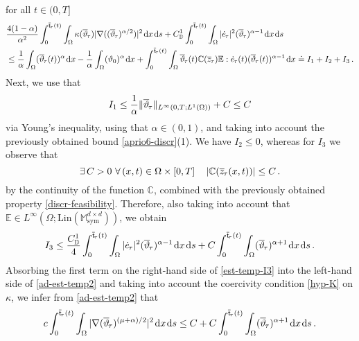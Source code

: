 \documentclass[a4paper,10pt,reqno]{amsart}
\numberwithin{equation}{section}
\newcommand{\bbM}{\mathbb{M}}
\numberwithin{equation}{section}
\def\dd{\;\!\mathrm{d}} %
\newcommand{\teta}{\vartheta}
\newcommand{\piecewiseConstant}[2]{\overline{#1}_{\kern-1pt#2}}
\newcommand{\pwc}{\piecewiseConstant}
\newcommand{\piecewiseLinear}[2]{{#1}_{\kern-1pt#2}}
\newcommand{\pwl}{\piecewiseLinear}
\newcommand{\bbC}{\mathbb{C}}
\newcommand{\bbD}{\mathbb{D}}
\newcommand{\bbE}{\mathbb{E}}
\newcommand{\mt}{\bbM}
\newcommand{\sym}{\mathrm{sym}}
\newcommand{\condu}{\kappa}
\begin{document}
 for all $t \in (0,T]$
 \begin{equation} 
 \label{ad-est-temp2}
 \begin{aligned}
 &
 \frac{4(1-\alpha)}{\alpha^2} \int_0^{\pwc{\mathsf{t}}{\tau}(t)} \int_\Omega \condu(\pwc \teta{\tau}) |\nabla ((\pwc \teta{\tau})^{\alpha/2}) |^2 \dd x \dd s  +   C_\bbD^1  \int_0^{\pwc{\mathsf{t}}{\tau}(t)}  \int_\Omega   %
 | \pwl {\dot e}\tau|^2 (\pwc \teta \tau)^{\alpha-1}  
 \dd x \dd s
\\
&
\leq
 \frac1\alpha\int_\Omega  (\pwc \teta\tau(t) )^{\alpha} \dd x -    \frac1\alpha\int_\Omega  (\teta_0)^{\alpha} \dd x +\int_0^{\pwc{\mathsf{t}}{\tau}(t)}  \int_\Omega   \pwc \teta\tau(t) \bbC(\pwc z\tau) \bbE : \pwl{\dot e}\tau(t)  ( \pwc \teta\tau(t) )^{\alpha-1}  \dd  x 
 \doteq
 I_1+I_2+I_3\,.
 \end{aligned}
 \end{equation}
 Next, we use that  
 \[
  I_1  \leq \frac1\alpha \| \pwc \teta\tau\|_{L^\infty (0,T; L^1(\Omega))} + C \leq C
 \]
 via Young's inequality, using that  $\alpha \in (0,1)$, and taking into account the previously obtained bound  \eqref{aprio6-discr}(1). 
 We have $I_2 \leq 0$, whereas for $I_3$ we observe  that 
 \begin{equation}
 \label{bound-bbC}
 \exists\, C>0 \ \forall\, (x,t) \in \Omega \times [0,T] \, \quad
 |\bbC(\pwc z\tau(x,t))| \leq C\,.
 \end{equation}
  by the continuity of the function $\bbC$, combined with the previously obtained
 property \eqref{discr-feasibility}. Therefore, also taking into account that $\bbE \in L^\infty (\Omega;\mathrm{Lin}(\mt_\sym^{d\times d}))$, we obtain 
   \begin{equation}
 \label{est-temp-I3}
 I_3 \leq 
\frac{ C_\bbD^1 }4   \int_0^{\pwc{\mathsf{t}}{\tau}(t)}  \int_\Omega  | \pwl {\dot e}\tau|^2 (\pwc \teta \tau)^{\alpha-1}   \dd x \dd s + C  \int_0^{\pwc{\mathsf{t}}{\tau}(t)}  \int_\Omega
(\pwc \teta \tau)^{\alpha+1}   \dd x \dd s\,.
 \end{equation}
 Absorbing the first term on the right-hand side of \eqref{est-temp-I3} into  the left-hand side of \eqref{ad-est-temp2} and taking into account the coercivity condition \eqref{hyp-K} on $\condu$,  
we infer from  \eqref{ad-est-temp2} that 
 \begin{equation}
  \label{ad-est-temp3}
 c   \int_0^{\pwc{\mathsf{t}}{\tau}(t)} \int_\Omega  | \nabla  (\pwc \teta \tau)^{(\mu+\alpha)/2} |^2 \dd x \dd s \leq C +  C  \int_0^{\pwc{\mathsf{t}}{\tau}(t)}  \int_\Omega
(\pwc \teta \tau)^{\alpha+1}   \dd x \dd s\,.
 \end{equation}
\end{document}
